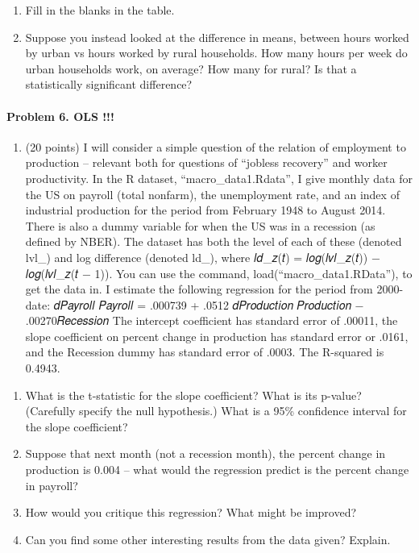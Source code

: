\documentclass[]{article}
\providecommand{\tightlist}{%
  \setlength{\itemsep}{0pt}\setlength{\parskip}{0pt}}
\let\oldparagraph\paragraph
\renewcommand{\paragraph}[1]{\oldparagraph{#1}\mbox{}}
\begin{document}
\begin{enumerate}
\def\labelenumi{\alph{enumi}.}
\tightlist
\item
  Fill in the blanks in the table.
\item
  Suppose you instead looked at the difference in means, between hours
  worked by urban vs hours worked by rural households. How many hours
  per week do urban households work, on average? How many for rural? Is
  that a statistically significant difference?
\end{enumerate}

\paragraph{Problem 6. OLS !!!}\label{problem-6.-ols}

\begin{enumerate}
\def\labelenumi{\arabic{enumi}.}
\setcounter{enumi}{16}
\tightlist
\item
  (20 points) I will consider a simple question of the relation of
  employment to production -- relevant both for questions of ``jobless
  recovery'' and worker productivity. In the R dataset,
  ``macro\_data1.Rdata'', I give monthly data for the US on payroll
  (total nonfarm), the unemployment rate, and an index of industrial
  production for the period from February 1948 to August 2014. There is
  also a dummy variable for when the US was in a recession (as defined
  by NBER). The dataset has both the level of each of these (denoted
  lvl\_) and log difference (denoted ld\_), where 𝑙𝑑\_𝑧(𝑡) =
  𝑙𝑜𝑔(𝑙𝑣𝑙\_𝑧(𝑡)) − 𝑙𝑜𝑔(𝑙𝑣𝑙\_𝑧(𝑡 − 1)). You can use the command,
  load(``macro\_data1.RData''), to get the data in. I estimate the
  following regression for the period from 2000-date: 𝑑𝑃𝑎𝑦𝑟𝑜𝑙𝑙 𝑃𝑎𝑦𝑟𝑜𝑙𝑙 =
  .000739 + .0512 𝑑𝑃𝑟𝑜𝑑𝑢𝑐𝑡𝑖𝑜𝑛 𝑃𝑟𝑜𝑑𝑢𝑐𝑡𝑖𝑜𝑛 − .00270𝑅𝑒𝑐𝑒𝑠𝑠𝑖𝑜𝑛 The intercept
  coefficient has standard error of .00011, the slope coefficient on
  percent change in production has standard error or .0161, and the
  Recession dummy has standard error of .0003. The R-squared is 0.4943.
\end{enumerate}

\begin{enumerate}
\def\labelenumi{\alph{enumi}.}
\tightlist
\item
  What is the t-statistic for the slope coefficient? What is its
  p-value? (Carefully specify the null hypothesis.) What is a 95\%
  confidence interval for the slope coefficient?
\item
  Suppose that next month (not a recession month), the percent change in
  production is 0.004 -- what would the regression predict is the
  percent change in payroll?
\item
  How would you critique this regression? What might be improved?
\item
  Can you find some other interesting results from the data given?
  Explain.
\end{enumerate}
\end{document}
